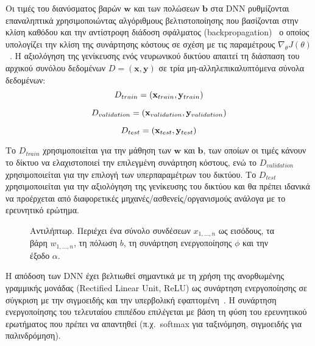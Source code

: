 Οι τιμές του διανύσματος βαρών $\mathbf{w}$ και των πολώσεων $\mathbf{b}$ στα DNN ρυθμίζονται επαναληπτικά χρησιμοποιώντας αλγόριθμους βελτιστοποίησης που βασίζονται στην κλίση καθόδου και την αντίστροφη διάδοση σφάλματος (backpropagation)~\cite{rumelhart1986learning} ο οποίος υπολογίζει την κλίση της συνάρτησης κόστους σε σχέση με τις παραμέτρους $\nabla_{\theta}J(\theta)$~\cite{goodfellow2016deep}.
Η αξιολόγηση της γενίκευσης ενός νευρωνικού δικτύου απαιτεί τη διάσπαση του αρχικού συνόλου δεδομένων $D=(\mathbf{x}, \mathbf{y})$ σε τρία μη-αλληλεπικαλυπτόμενα σύνολα δεδομένων:
\begin{equation}
	\centering
	D_{train}=(\mathbf{x}_{train}, \mathbf{y}_{train})
\end{equation}

\begin{equation}
	\centering
	D_{validation}=(\mathbf{x}_{validation}, \mathbf{y}_{validation})
\end{equation}

\begin{equation}
	\centering
	D_{test}=(\mathbf{x}_{test}, \mathbf{y}_{test})
\end{equation}


Το $D_{train}$ χρησιμοποιείται για την μάθηση των $\mathbf{w}$ και $\mathbf{b}$, των οποίων οι τιμές κάνουν το δίκτυο να ελαχιστοποιεί την επιλεγμένη συνάρτηση κόστους, ενώ το $D_{validation}$ χρησιμοποιείται για την επιλογή των υπερπαραμέτρων του δικτύου.
Το $D_{test}$ χρησιμοποιείται για την αξιολόγηση της γενίκευσης του δικτύου και θα πρέπει ιδανικά να προέρχεται από διαφορετικές μηχανές/ασθενείς/οργανισμούς ανάλογα με το ερευνητικό ερώτημα.

\begin{figure}[!t]
	\centering
	
	\caption[Αντιλήπτωρ]{Αντιλήπτωρ.
	Περιέχει ένα σύνολο συνδέσεων $x_{1, \ldots, n}$ ως εισόδους, τα βάρη $w_{1, \ldots, n}$, τη πόλωση $b$, τη συνάρτηση ενεργοποίησης $\phi$ και την έξοδο $\alpha$.
	}
	\label{fig:perceptron}
\end{figure}

Η απόδοση των DNN έχει βελτιωθεί σημαντικά με τη χρήση της ανορθωμένης γραμμικής μονάδας (Rectified Linear Unit, ReLU) ως συνάρτηση ενεργοποίησης σε σύγκριση με την σιγμοειδής και την υπερβολική εφαπτομένη~\cite{glorot2011deep}.
Η συνάρτηση ενεργοποίησης του τελευταίου επιπέδου επιλέγεται με βάση τη φύση του ερευνητικού ερωτήματος που πρέπει να απαντηθεί (π.χ.\ softmax για ταξινόμηση, σιγμοειδής για παλινδρόμηση).

